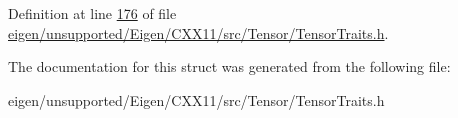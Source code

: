 Definition at line \hyperlink{eigen_2unsupported_2_eigen_2_c_x_x11_2src_2_tensor_2_tensor_traits_8h_source_l00176}{176} of file \hyperlink{eigen_2unsupported_2_eigen_2_c_x_x11_2src_2_tensor_2_tensor_traits_8h_source}{eigen/unsupported/\+Eigen/\+C\+X\+X11/src/\+Tensor/\+Tensor\+Traits.\+h}.



The documentation for this struct was generated from the following file\+:\begin{DoxyCompactItemize}
\item 
eigen/unsupported/\+Eigen/\+C\+X\+X11/src/\+Tensor/\+Tensor\+Traits.\+h\end{DoxyCompactItemize}
